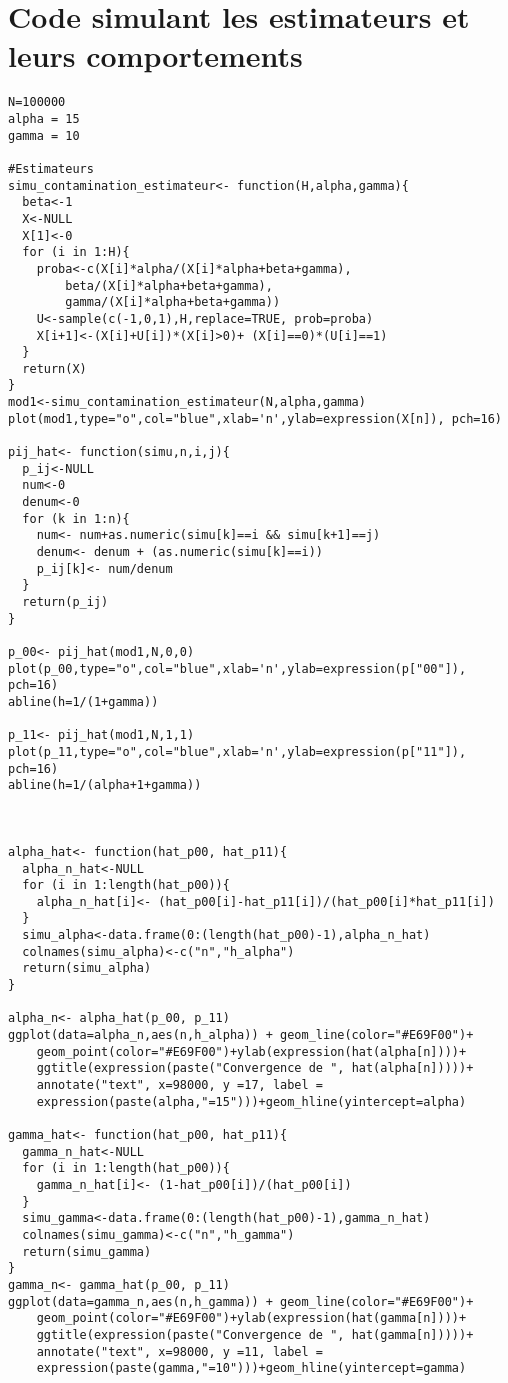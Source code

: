\documentclass[12pt,a4paper]{report}
\theoremstyle{remark}
\begin{document}
\section*{Code simulant les estimateurs et leurs comportements}
\begin{lstlisting}
N=100000
alpha = 15
gamma = 10

#Estimateurs
simu_contamination_estimateur<- function(H,alpha,gamma){
  beta<-1
  X<-NULL
  X[1]<-0
  for (i in 1:H){
    proba<-c(X[i]*alpha/(X[i]*alpha+beta+gamma),
        beta/(X[i]*alpha+beta+gamma),
        gamma/(X[i]*alpha+beta+gamma))
    U<-sample(c(-1,0,1),H,replace=TRUE, prob=proba)
    X[i+1]<-(X[i]+U[i])*(X[i]>0)+ (X[i]==0)*(U[i]==1)
  }
  return(X)
}
mod1<-simu_contamination_estimateur(N,alpha,gamma)
plot(mod1,type="o",col="blue",xlab='n',ylab=expression(X[n]), pch=16)

pij_hat<- function(simu,n,i,j){
  p_ij<-NULL
  num<-0
  denum<-0
  for (k in 1:n){
    num<- num+as.numeric(simu[k]==i && simu[k+1]==j)
    denum<- denum + (as.numeric(simu[k]==i))
    p_ij[k]<- num/denum
  }
  return(p_ij)
}

p_00<- pij_hat(mod1,N,0,0)
plot(p_00,type="o",col="blue",xlab='n',ylab=expression(p["00"]), pch=16)
abline(h=1/(1+gamma))

p_11<- pij_hat(mod1,N,1,1)
plot(p_11,type="o",col="blue",xlab='n',ylab=expression(p["11"]), pch=16)
abline(h=1/(alpha+1+gamma))



alpha_hat<- function(hat_p00, hat_p11){
  alpha_n_hat<-NULL
  for (i in 1:length(hat_p00)){
    alpha_n_hat[i]<- (hat_p00[i]-hat_p11[i])/(hat_p00[i]*hat_p11[i])
  }
  simu_alpha<-data.frame(0:(length(hat_p00)-1),alpha_n_hat)
  colnames(simu_alpha)<-c("n","h_alpha")
  return(simu_alpha)
}

alpha_n<- alpha_hat(p_00, p_11)
ggplot(data=alpha_n,aes(n,h_alpha)) + geom_line(color="#E69F00")+
    geom_point(color="#E69F00")+ylab(expression(hat(alpha[n])))+
    ggtitle(expression(paste("Convergence de ", hat(alpha[n]))))+
    annotate("text", x=98000, y =17, label = 
    expression(paste(alpha,"=15")))+geom_hline(yintercept=alpha)

gamma_hat<- function(hat_p00, hat_p11){
  gamma_n_hat<-NULL
  for (i in 1:length(hat_p00)){
    gamma_n_hat[i]<- (1-hat_p00[i])/(hat_p00[i])
  }
  simu_gamma<-data.frame(0:(length(hat_p00)-1),gamma_n_hat)
  colnames(simu_gamma)<-c("n","h_gamma")
  return(simu_gamma)
}
gamma_n<- gamma_hat(p_00, p_11)
ggplot(data=gamma_n,aes(n,h_gamma)) + geom_line(color="#E69F00")+
    geom_point(color="#E69F00")+ylab(expression(hat(gamma[n])))+
    ggtitle(expression(paste("Convergence de ", hat(gamma[n]))))+
    annotate("text", x=98000, y =11, label =
    expression(paste(gamma,"=10")))+geom_hline(yintercept=gamma)



\end{lstlisting}
\end{document}
